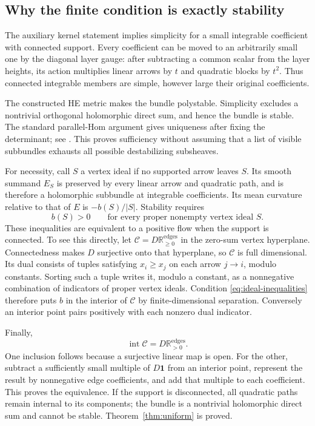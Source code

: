\documentclass[11pt]{amsart}
\theoremstyle{definition}
\theoremstyle{remark}
\newcommand{\RR}{\mathbb R}
\begin{document}
\subsection{Why the finite condition is exactly stability}
The auxiliary kernel statement implies simplicity for a small integrable
coefficient with connected support. Every coefficient can be moved to an
arbitrarily small one by the diagonal layer gauge: after subtracting a
common scalar from the layer heights, its action multiplies linear arrows
by $t$ and quadratic blocks by $t^2$. Thus connected integrable members
are simple, however large their original coefficients.

The constructed HE metric makes the bundle polystable. Simplicity excludes
a nontrivial orthogonal holomorphic direct sum, and hence the bundle is
stable. The standard parallel-Hom argument gives uniqueness after fixing
the determinant; see \cite[Theorem~5.8.3 and Proposition~4.1.7]{kobayashi1987}.
This proves sufficiency without assuming that a list of visible subbundles
exhausts all possible destabilizing subsheaves.

For necessity, call $S$ a vertex ideal if no supported arrow leaves $S$.
Its smooth summand $E_S$ is preserved by every linear arrow and quadratic
path, and is therefore a holomorphic subbundle at integrable coefficients.
Its mean curvature relative to that of $E$ is $-b(S)/|S|$. Stability
requires
\begin{equation}\label{eq:ideal-inequalities}
 b(S)>0\qquad\text{for every proper nonempty vertex ideal }S.
\end{equation}
These inequalities are equivalent to a positive flow when the support is
connected. To see this directly, let $\mathcal C=D\RR_{\ge0}^{\mathrm{edges}}$
in the zero-sum vertex hyperplane. Connectedness makes $D$ surjective
onto that hyperplane, so $\mathcal C$ is full dimensional. Its dual consists
of tuples satisfying $x_i\ge x_j$ on each arrow $j\to i$, modulo
constants. Sorting such a tuple writes it, modulo a constant, as a
nonnegative combination of indicators of proper vertex ideals. Condition
\eqref{eq:ideal-inequalities} therefore puts $b$ in the interior of
$\mathcal C$ by finite-dimensional separation. Conversely an interior
point pairs positively with each nonzero dual indicator.

Finally,
\[
 \operatorname{int}\mathcal C=D\RR_{>0}^{\mathrm{edges}}.
\]
One inclusion follows because a surjective linear map is open. For the
other, subtract a sufficiently small multiple of $D\mathbf1$ from an
interior point, represent the result by nonnegative edge coefficients,
and add that multiple to each coefficient. This proves the equivalence.
If the support is disconnected, all quadratic paths remain internal to
its components; the bundle is a nontrivial holomorphic direct sum and
cannot be stable. Theorem~\ref{thm:uniform} is proved.
\end{document}

